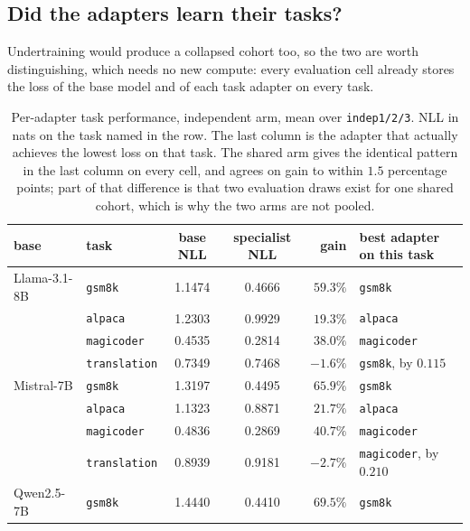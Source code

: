 \subsection{Did the adapters learn their tasks?}
\label{app:adapter-quality}

Undertraining would produce a collapsed cohort too, so the two are worth
distinguishing, which needs no new compute: every evaluation cell already
stores the loss of the base model and of each task adapter on every task.

\begin{table}[tb]
\centering
\small
\caption{Per-adapter task performance, independent arm, mean over
\texttt{indep1/2/3}. NLL in nats on the task named in the row. The last
column is the adapter that actually achieves the lowest loss on that task.
The shared arm gives the identical pattern in the last column on every cell,
and agrees on gain to within $1.5$ percentage points; part of that difference
is that two evaluation draws exist for one shared cohort, which is why the
two arms are not pooled.}
\label{tab:adapter-quality}
\begin{tabular}{llccrl}
\toprule
base & task & base NLL & specialist NLL & gain & best adapter on this task \\
\midrule
Llama-3.1-8B & \texttt{gsm8k}       & 1.1474 & 0.4666 & $59.3\%$ & \texttt{gsm8k} \\
             & \texttt{alpaca}      & 1.2303 & 0.9929 & $19.3\%$ & \texttt{alpaca} \\
             & \texttt{magicoder}   & 0.4535 & 0.2814 & $38.0\%$ & \texttt{magicoder} \\
             & \texttt{translation} & 0.7349 & 0.7468 & $-1.6\%$ & \texttt{gsm8k}, by $0.115$ \\
\addlinespace
Mistral-7B   & \texttt{gsm8k}       & 1.3197 & 0.4495 & $65.9\%$ & \texttt{gsm8k} \\
             & \texttt{alpaca}      & 1.1323 & 0.8871 & $21.7\%$ & \texttt{alpaca} \\
             & \texttt{magicoder}   & 0.4836 & 0.2869 & $40.7\%$ & \texttt{magicoder} \\
             & \texttt{translation} & 0.8939 & 0.9181 & $-2.7\%$ & \texttt{magicoder}, by $0.210$ \\
\addlinespace
Qwen2.5-7B   & \texttt{gsm8k}       & 1.4440 & 0.4410 & $69.5\%$ & \texttt{gsm8k} \\

\end{tabular}
\end{table}
